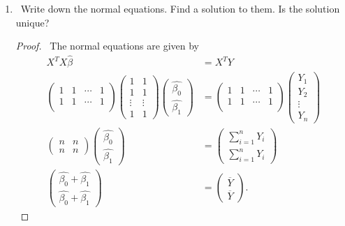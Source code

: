 \documentclass[12pt]{article}
\begin{document}
\begin{enumerate}[leftmargin=0cm,itemindent=.5cm,labelwidth=\itemindent,labelsep=0cm,align=left]
\begin{enumerate}
\item \ Write down the normal equations.  Find a solution to them.  Is the solution unique?

\begin{proof}

\ The normal equations are given by 
\begin{align*}
X^T X \hat{\beta} &= X^T Y \\
\begin{pmatrix}						%
1 & 1 & \cdots & 1 \\ 
1 & 1 & \cdots & 1 \\ 
\end{pmatrix}
\begin{pmatrix}						%
1 & 1 \\ 
1 & 1 \\ 
\vdots & \vdots \\ 
1 & 1
\end{pmatrix}
\begin{pmatrix}						%
\hat{\beta_0} \\ 
\hat{\beta_1}
\end{pmatrix}
&= \begin{pmatrix}					%
1 & 1 & \cdots & 1 \\ 
1 & 1 & \cdots & 1 \\ 
\end{pmatrix}
\begin{pmatrix}						%
Y_1 \\
Y_2 \\
\vdots \\
Y_n
\end{pmatrix}
\\									%
\begin{pmatrix}						%
n & n \\
n & n
\end{pmatrix}
\begin{pmatrix}						%
\hat{\beta_0} \\ 
\hat{\beta_1}
\end{pmatrix}
&=
\begin{pmatrix}						%
\sum\limits_{i=1}^n Y_i \\
\sum\limits_{i=1}^n Y_i
\end{pmatrix} \\
\begin{pmatrix}						
\hat{\beta_0} + \hat{\beta_1} \\
\hat{\beta_0} + \hat{\beta_1}
\end{pmatrix}
&=
\begin{pmatrix}
\overline{Y} \\
\overline{Y}
\end{pmatrix}.
\end{align*}


\end{proof}
\end{enumerate}
\end{enumerate}
\end{document}
